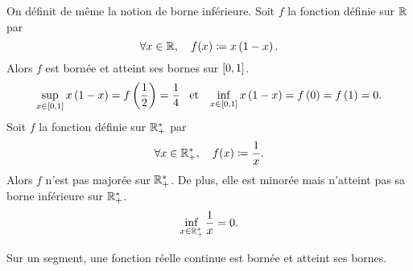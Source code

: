 \documentclass{magnolia}
\begin{document}
\begin{remarques}
\remarque On définit de même la notion de borne inférieure.
\remarque Soit $f$ la fonction définie sur $\mathbb{R}$  par
  \[\forall x\in\mathbb{R} ,\quad f(x)\coloneqq x\left(1-x\right).\]
  Alors $f$ est bornée et atteint ses bornes sur $\left[0,1\right]$.
  \[\sup_{x\in\left[0,1\right]} x\left(1-x\right)=f\left(\frac{1}{2}\right)=\frac{1}{4} \quad\!\text{et}\quad\!
    \inf_{x\in\left[0,1\right]} x\left(1-x\right)=f\left(0\right)=f\left(1\right)=0.\]
\remarque Soit $f$ la fonction définie sur $\mathbb{R}_+^*$ par
  \[\forall x\in\mathbb{R}_+^* ,\quad f(x)\coloneqq \frac{1}{x}.\]
  Alors $f$ n'est pas majorée sur $\mathbb{R}_+^*$. De plus, elle est minorée mais
  n'atteint pas sa borne inférieure sur $\mathbb{R}_+^*$.
  \[\inf_{x\in\mathbb{R}_+^*} \frac{1}{x}=0.\]
\end{remarques}

\begin{theoreme}[nom={Théorème de compacité}]
Sur un segment, une fonction réelle continue est bornée et atteint ses bornes.
\end{theoreme}
\end{document}
